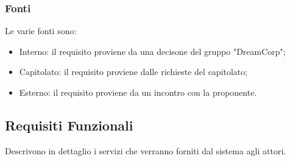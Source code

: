     
    \subsubsection{Fonti}
    Le varie fonti sono:
        \begin{itemize}
            \item Interno: il requisito proviene da una decisone del gruppo "DreamCorp";
            \item Capitolato: il requisito proviene dalle richieste del capitolato;
            \item Esterno: il requisito proviene da un incontro con la proponente.
        \end{itemize}
    
		\subsection{Requisiti Funzionali}			
        Descrivono in dettaglio i servizi che verranno forniti dal sistema agli attori.
        
